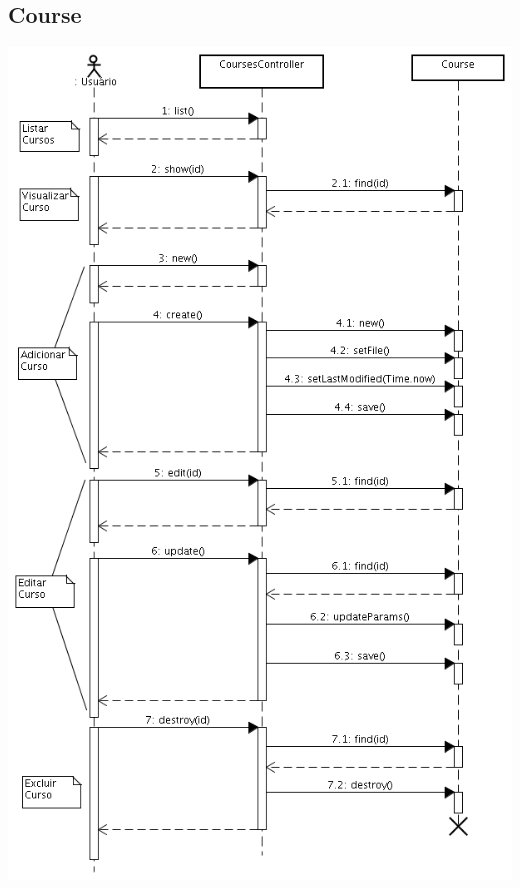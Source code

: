 \documentclass[11pt]{article}
\begin{document}
\subsection{Course}
\includegraphics[width=130truemm]{seq_course.png}
\end{document}
